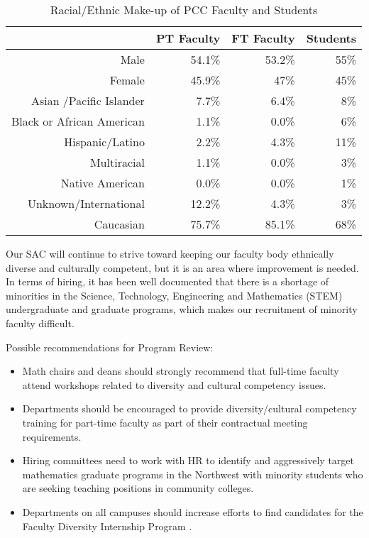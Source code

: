 \begin{table}[!htb]
  \centering
  \caption{Racial/Ethnic Make-up of PCC Faculty and Students}
  \label{reflect:tab:racialethnicmakeup}
  \begin{tabular}{rrrr}
    \toprule
            &PT Faculty &   FT Faculty  & Students\\
            \midrule
    Male    & 54.1\%    & 53.2\%     & 55\% \\
    Female  & 45.9\%    & 47\%       & 45\% \\
    Asian /Pacific Islander & 7.7\% &   6.4\%    & 8\%\\
    Black or African American &   1.1\%  &  0.0\% &   6\%\\
    Hispanic/Latino &  2.2\%   & 4.3\%  &  11\%\\
    Multiracial & 1.1\%  &  0.0\%  &  3\%\\
    Native American & 0.0\%  &  0.0\%  &  1\%\\
    Unknown/International   & 12.2\% &  4.3\% &    3\%\\
    Caucasian   & 75.7\%   & 85.1\%   & 68\%\\
    \bottomrule
  \end{tabular}
\end{table}

Our SAC will continue to strive toward keeping our faculty body ethnically diverse and culturally competent, but it is an area where improvement is needed. In terms of hiring, it has been well documented  that there is a shortage of minorities in the Science, Technology, Engineering and Mathematics (STEM) undergraduate and graduate programs, which makes our recruitment of minority faculty difficult.

Possible recommendations for Program Review:
\begin{itemize}
  \item Math chairs and deans should strongly recommend that full-time faculty attend workshops related to diversity and cultural competency issues.
  \item Departments should be encouraged to provide diversity/cultural competency training for part-time faculty as part of their contractual meeting requirements.\item Hiring committees need to work with HR to identify and aggressively target mathematics graduate programs in the Northwest with minority students who are seeking teaching positions in community colleges.
  \item Departments on all campuses should increase efforts to find candidates for the Faculty Diversity Internship Program \cite{affirmativeaction}.
\end{itemize}
